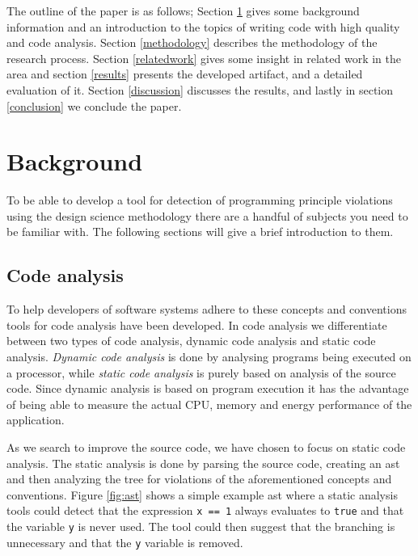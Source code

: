 \documentclass{article}
\begin{document}
The outline of the paper is as follows; Section \ref{background} gives some background information and an introduction to the topics of writing code with high quality and code analysis. Section \ref{methodology} describes the methodology of the research process. Section \ref{relatedwork} gives some insight in related work in the area and section \ref{results} presents the developed artifact, and a detailed evaluation of it. Section \ref{discussion} discusses the results, and lastly in section \ref{conclusion} we conclude the paper.  

\section{Background}
\label{background}
To be able to develop a tool for detection of programming principle violations using the design science methodology there are a handful of  subjects you need to be familiar with. The following sections will give a brief introduction to them.


\subsection{Code analysis}
To help developers of software systems adhere to these concepts and conventions tools for code analysis have been developed. In code analysis we differentiate between two types of code analysis, dynamic code analysis and static code analysis. \textit{Dynamic code analysis} is done by analysing programs being executed on a processor, while \textit{static code analysis} is purely based on analysis of the source code. Since dynamic analysis is based on program execution it has the advantage of being able to measure the actual CPU, memory and energy performance of the application. 


As we search to improve the source code, we have chosen to focus on static code analysis. The static analysis is done by parsing the source code, creating an \gls{ast} and then analyzing the tree for violations of the aforementioned concepts and conventions. Figure \ref{fig:ast} shows a simple example \gls{ast} where a static analysis tools could detect that the expression \texttt{x == 1} always evaluates to \texttt{true} and that the variable \texttt{y} is never used. The tool could then suggest that the branching is unnecessary and that the \texttt{y} variable is removed.  
\end{document}
